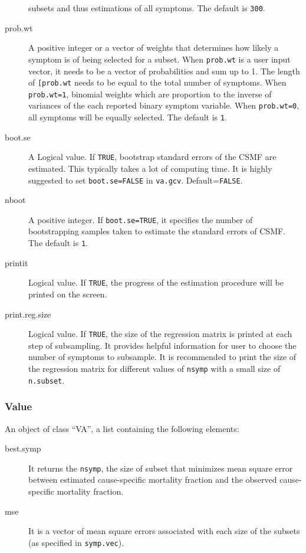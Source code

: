 \documentclass[oneside,letterpaper,titlepage]{article}
\begin{document}
\begin{description}
     subsets and thus estimations of all symptoms.
     The default is \texttt{300}.
   \item[prob.wt] A positive integer or a vector of weights that determines how
     likely a symptom is of being selected for a subset. When
     \texttt{prob.wt} is a user input vector, it needs to be a vector 
     of probabilities and sum up to 1. The length of
     \texttt{[prob.wt} needs to be equal to the total number of symptoms.
     When \texttt{prob.wt=1}, binomial weights which are proportion to 
     the inverse of variances of the each reported binary symptom variable.   
     When \texttt{prob.wt=0}, all symptoms will be equally selected. 
     The default is \texttt{1}.
   \item[boot.se] A Logical value. If \texttt{TRUE}, bootstrap
     standard errors of the CSMF are estimated.  This typically takes a lot
     of computing time. It is highly suggested to set
     \texttt{boot.se=FALSE} in \texttt{va.gcv}. Default=\texttt{FALSE}.
  \item[nboot] A positive integer. If \texttt{boot.se=TRUE}, it
    specifies the number of bootstrapping samples taken to estimate the
    standard errors of CSMF. The default is \texttt{1}.
  \item[printit] Logical value. If \texttt{TRUE}, the progress of the
    estimation procedure will be printed on the screen.
  \item[print.reg.size] Logical value. If \texttt{TRUE}, the size of the
  regression matrix is printed at each step of subsampling. It provides
  helpful information for user to choose the number of symptoms to
  subsample. It is recommended to print the size of the regression
  matrix for different values of \texttt{nsymp} with a small size of
  \texttt{n.subset}. 
\end{description}

\subsubsection{Value}
An object of class ``VA'', a list containing the following elements:
\begin{description}
 \item[best.symp] It returns the \texttt{nsymp}, the size of
  subset that minimizes mean square error between estimated
  cause-specific mortality fraction and the observed cause-specific
  mortality fraction. 
\item[mse] It is a vector of  mean square errors
  associated with each size of the subsets (as specified in \texttt{symp.vec}).
\end{description}

 
\bibsep=0in 

\end{document}
